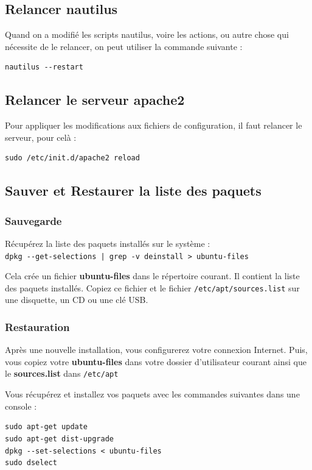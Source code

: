 \documentclass[a4paper,twoside]{article}
\begin{document}
\subsection{Relancer nautilus}
Quand on a modifié les scripts nautilus, voire les actions, ou autre chose qui nécessite de le relancer, on peut utiliser la commande suivante :
\begin{verbatim}
nautilus --restart
\end{verbatim}

\subsection{Relancer le serveur apache2}
Pour appliquer les modifications aux fichiers de configuration, il faut relancer le serveur, pour celà :
\begin{verbatim}
sudo /etc/init.d/apache2 reload
\end{verbatim}



\subsection{Sauver et Restaurer la liste des paquets}
\subsubsection{Sauvegarde}

Récupérez la liste des paquets installés sur le système :\\
\verb#dpkg --get-selections | grep -v deinstall > ubuntu-files#

Cela crée un fichier \textbf{ubuntu-files} dans le répertoire courant. Il contient la liste des paquets installés. Copiez ce fichier et le fichier \verb|/etc/apt/sources.list| sur une disquette, un CD ou une clé USB.
\subsubsection{Restauration}

Après une nouvelle installation, vous configurerez votre connexion Internet. Puis, vous copiez votre \textbf{ubuntu-files} dans votre dossier d'utilisateur courant ainsi que le \textbf{sources.list} dans \verb|/etc/apt|

Vous récupérez et installez vos paquets avec les commandes suivantes dans une console :

\begin{verbatim}
sudo apt-get update
sudo apt-get dist-upgrade
dpkg --set-selections < ubuntu-files
sudo dselect
\end{verbatim}
\end{document}
